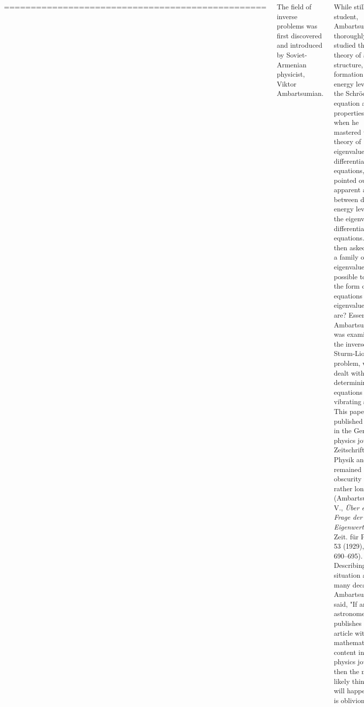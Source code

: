 \documentclass[a0paper,25pt]{tikzposter} %
\begin{document}
\begin{columns}
{=================================================

The field of inverse problems was first discovered and introduced by Soviet-Armenian physicist, Viktor Ambartsumian.

While still a student, Ambartsumian thoroughly studied the theory of atomic structure, the formation of energy levels, and the Schr\"odinger equation and its properties, and when he mastered the theory of eigenvalues of differential equations, he pointed out the apparent analogy between discrete energy levels and the eigenvalues of differential equations. He then asked: given a family of eigenvalues, is it possible to find the form of the equations whose eigenvalues they are? Essentially Ambartsumian was examining the inverse Sturm-Liouville problem, which dealt with determining the equations of a vibrating string. This paper was published in 1929 in the German physics journal Zeitschrift f\"ur Physik and remained in obscurity for a rather long time (Ambartsumian V., {\it\"Uber eine Frage der Eigenwerttheorie.}, Zeit. f\"ur Phys., 53 (1929), pp. 690--695). Describing this situation after many decades, Ambartsumian said, "If an astronomer publishes an article with a mathematical content in a physics journal, then the most likely thing that will happen to it is oblivion."

Nonetheless, toward the end of the Second World War, this article, written by the 20-year-old Ambartsumian, was found by Swedish mathematicians and formed the starting point for a whole area of research on inverse problems, becoming the foundation of an entire discipline.
}


\end{columns}
\end{document}
